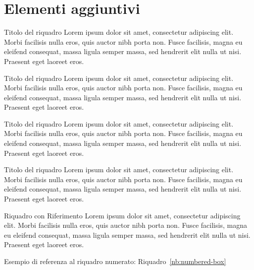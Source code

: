 
\chapter{Elementi aggiuntivi}

\begin{blue-box}{Titolo del riquadro}
Lorem ipsum dolor sit amet, consectetur adipiscing elit. Morbi facilisis nulla eros, quis auctor nibh porta non. Fusce facilisis, magna eu eleifend consequat, massa ligula semper massa, sed hendrerit elit nulla ut nisi. Praesent eget laoreet eros. 
\end{blue-box}

\begin{orange-box}{Titolo del riquadro}
Lorem ipsum dolor sit amet, consectetur adipiscing elit. Morbi facilisis nulla eros, quis auctor nibh porta non. Fusce facilisis, magna eu eleifend consequat, massa ligula semper massa, sed hendrerit elit nulla ut nisi. Praesent eget laoreet eros. 
\end{orange-box}

\begin{red-box}{Titolo del riquadro}
Lorem ipsum dolor sit amet, consectetur adipiscing elit. Morbi facilisis nulla eros, quis auctor nibh porta non. Fusce facilisis, magna eu eleifend consequat, massa ligula semper massa, sed hendrerit elit nulla ut nisi. Praesent eget laoreet eros. 
\end{red-box}

\begin{green-box}{Titolo del riquadro}
Lorem ipsum dolor sit amet, consectetur adipiscing elit. Morbi facilisis nulla eros, quis auctor nibh porta non. Fusce facilisis, magna eu eleifend consequat, massa ligula semper massa, sed hendrerit elit nulla ut nisi. Praesent eget laoreet eros. 
\end{green-box}

\begin{numbered-box}{Riquadro con Riferimento}\label{nb:numbered-box}
Lorem ipsum dolor sit amet, consectetur adipiscing elit. Morbi facilisis nulla eros, quis auctor nibh porta non. Fusce facilisis, magna eu eleifend consequat, massa ligula semper massa, sed hendrerit elit nulla ut nisi. Praesent eget laoreet eros. 
\end{numbered-box}

\noindent
Esempio di referenza al riquadro numerato: Riquadro~\ref{nb:numbered-box}